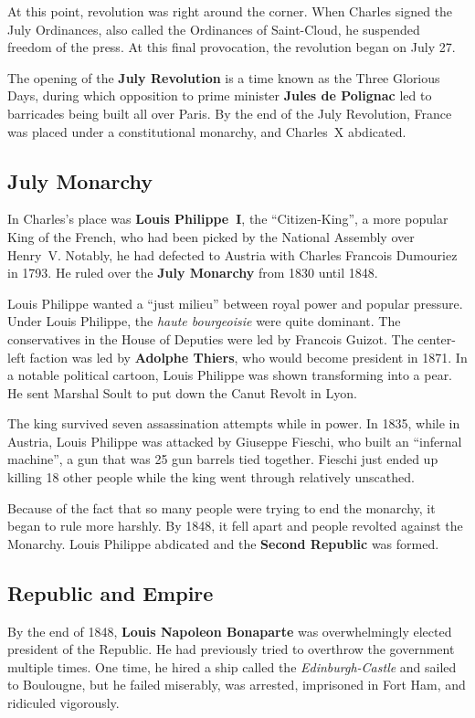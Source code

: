 At this point, revolution was right around the corner.
When Charles signed the July Ordinances, also called the Ordinances of Saint-Cloud,
he suspended freedom of the press.
At this final provocation, the revolution began on July 27.

The opening of the \textbf{July Revolution} is a time known as the Three Glorious Days,
during which opposition to prime minister \textbf{Jules de Polignac} led to barricades being built all over Paris.
By the end of the July Revolution, France was placed under a constitutional monarchy, and Charles~X abdicated.

\subsection*{July Monarchy}

In Charles's place was \textbf{Louis Philippe~I}, the ``Citizen-King'', a more popular King of the French,
who had been picked by the National Assembly over Henry~V.
Notably, he had defected to Austria with Charles Francois Dumouriez in 1793.
He ruled over the \textbf{July Monarchy} from 1830 until 1848.

Louis Philippe wanted a ``just milieu'' between royal power and popular pressure.
Under Louis Philippe, the \textit{haute bourgeoisie} were quite dominant.
The conservatives in the House of Deputies were led by Francois Guizot.
The center-left faction was led by \textbf{Adolphe Thiers}, who would become president in 1871.
In a notable political cartoon, Louis Philippe was shown transforming into a pear.
He sent Marshal Soult to put down the Canut Revolt in Lyon.

The king survived seven assassination attempts while in power.
In 1835, while in Austria, Louis Philippe was attacked by Giuseppe Fieschi, who built an ``infernal machine'',
a gun that was 25 gun barrels tied together.
Fieschi just ended up killing 18 other people while the king went through relatively unscathed.

Because of the fact that so many people were trying to end the monarchy, it began to rule more harshly.
By 1848, it fell apart and people revolted against the Monarchy.
Louis Philippe abdicated and the \textbf{Second Republic} was formed.

\subsection*{Republic and Empire}

By the end of 1848, \textbf{Louis Napoleon Bonaparte} was overwhelmingly elected president of the Republic.
He had previously tried to overthrow the government multiple times.
One time, he hired a ship called the \textit{Edinburgh-Castle} and sailed to Boulougne,
but he failed miserably, was arrested, imprisoned in Fort Ham, and ridiculed vigorously.


